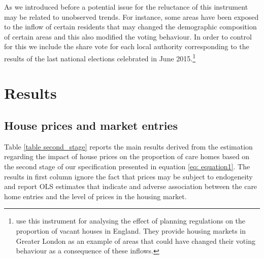 \documentclass[12pt,letterpaper]{article}
\begin{document}
  As we introduced before a potential issue for the reluctance of this instrument may be related to 
unobserved trends. For instance, some areas have been exposed to the inflow of
certain residents that may changed the demographic composition of certain areas and this also modified the voting behaviour. In order to 
control for this we include the share vote for each local authority 
corresponding to the results of the last national elections celebrated in June 
2015.\footnote{ \citet{cheshire2016} use this instrument for analysing the effect of planning regulations on the 
proportion of vacant houses in England. They provide housing markets in Greater London as an example of areas
that could have changed  their voting behaviour as a consequence of these inflows.}

\section{Results}

\subsection{House prices and market entries}

Table \ref{table second_stage} reports the main results derived from the estimation regarding the impact 
of house prices on the proportion of care homes based on the second stage of our 
specification presented in equation \ref{eq: equation1}. The results in first column 
ignore the fact that prices may be subject to endogeneity and report OLS estimates that indicate 
and adverse association between the care home entries and the level of prices in 
the housing market. 
\end{document}
